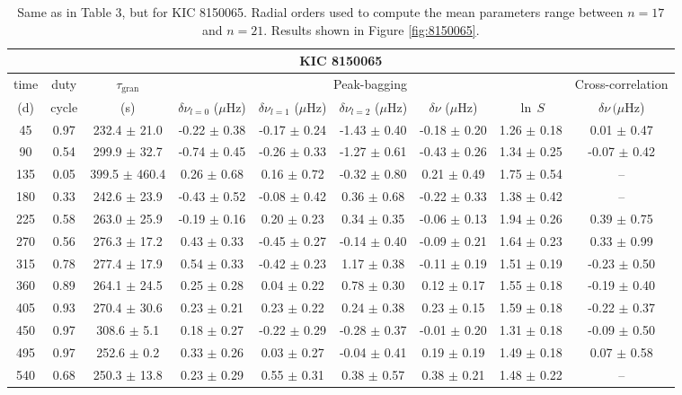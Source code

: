 \documentclass[twocolumn]{aastex61}%
\begin{document}
\begin{table*}[ht]\centering\fontsize{9.}{7.}\selectfont
\begin{tabular}{ccc|ccccc|c}
\multicolumn{9}{c}{KIC 8150065}\\ \hline\hline
time & duty & $\tau_\text{gran}$ &\multicolumn{5}{c|}{Peak-bagging}&Cross-correlation\\
(d)& cycle & (s)&$\delta\nu_{l=0}$ ($\mu$Hz) & $\delta\nu_{l=1}$ ($\mu$Hz) & $\delta\nu_{l=2}$ ($\mu$Hz) & $\delta\nu$ ($\mu$Hz)& $\ln\,S$ & $\delta\nu\,(\mu$Hz)\\\hline
45 & 0.97 & 232.4 $\pm$ 21.0 & -0.22 $\pm$ 0.38 & -0.17 $\pm$ 0.24 & -1.43 $\pm$ 0.40 & -0.18 $\pm$ 0.20 & 1.26 $\pm$ 0.18 & 0.01 $\pm$ 0.47\\
90 & 0.54 & 299.9 $\pm$ 32.7 & -0.74 $\pm$ 0.45 & -0.26 $\pm$ 0.33 & -1.27 $\pm$ 0.61 & -0.43 $\pm$ 0.26 & 1.34 $\pm$ 0.25 & -0.07 $\pm$ 0.42\\
135 & 0.05 & 399.5 $\pm$ 460.4 & 0.26 $\pm$ 0.68 & 0.16 $\pm$ 0.72 & -0.32 $\pm$ 0.80 & 0.21 $\pm$ 0.49 & 1.75 $\pm$ 0.54 & --\\
180 & 0.33 & 242.6 $\pm$ 23.9 & -0.43 $\pm$ 0.52 & -0.08 $\pm$ 0.42 & 0.36 $\pm$ 0.68 & -0.22 $\pm$ 0.33 & 1.38 $\pm$ 0.42 & --\\
225 & 0.58 & 263.0 $\pm$ 25.9 & -0.19 $\pm$ 0.16 & 0.20 $\pm$ 0.23 & 0.34 $\pm$ 0.35 & -0.06 $\pm$ 0.13 & 1.94 $\pm$ 0.26 & 0.39 $\pm$ 0.75\\
270 & 0.56 & 276.3 $\pm$ 17.2 & 0.43 $\pm$ 0.33 & -0.45 $\pm$ 0.27 & -0.14 $\pm$ 0.40 & -0.09 $\pm$ 0.21 & 1.64 $\pm$ 0.23 & 0.33 $\pm$ 0.99\\
315 & 0.78 & 277.4 $\pm$ 17.9 & 0.54 $\pm$ 0.33 & -0.42 $\pm$ 0.23 & 1.17 $\pm$ 0.38 & -0.11 $\pm$ 0.19 & 1.51 $\pm$ 0.19 & -0.23 $\pm$ 0.50\\
360 & 0.89 & 264.1 $\pm$ 24.5 & 0.25 $\pm$ 0.28 & 0.04 $\pm$ 0.22 & 0.78 $\pm$ 0.30 & 0.12 $\pm$ 0.17 & 1.55 $\pm$ 0.18 & -0.19 $\pm$ 0.40\\
405 & 0.93 & 270.4 $\pm$ 30.6 & 0.23 $\pm$ 0.21 & 0.23 $\pm$ 0.22 & 0.24 $\pm$ 0.38 & 0.23 $\pm$ 0.15 & 1.59 $\pm$ 0.18 & -0.22 $\pm$ 0.37\\
450 & 0.97 & 308.6 $\pm$ 5.1 & 0.18 $\pm$ 0.27 & -0.22 $\pm$ 0.29 & -0.28 $\pm$ 0.37 & -0.01 $\pm$ 0.20 & 1.31 $\pm$ 0.18 & -0.09 $\pm$ 0.50\\
495 & 0.97 & 252.6 $\pm$ 0.2 & 0.33 $\pm$ 0.26 & 0.03 $\pm$ 0.27 & -0.04 $\pm$ 0.41 & 0.19 $\pm$ 0.19 & 1.49 $\pm$ 0.18 & 0.07 $\pm$ 0.58\\
540 & 0.68 & 250.3 $\pm$ 13.8 & 0.23 $\pm$ 0.29 & 0.55 $\pm$ 0.31 & 0.38 $\pm$ 0.57 & 0.38 $\pm$ 0.21 & 1.48 $\pm$ 0.22 & --\\
\end{tabular}
\caption{Same as in Table 3, but for KIC 8150065. Radial orders used to compute the mean parameters range between $n=17$ and $n=21$. Results shown in Figure \ref{fig:8150065}.}\label{tab:8150065}
\end{table*}
\end{document}
